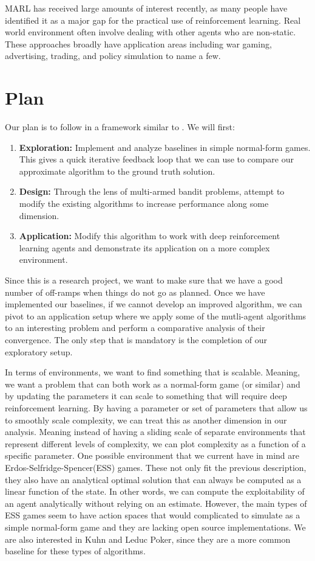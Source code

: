 \documentclass{article}
\begin{document}
MARL has received large amounts of interest recently, as many people have
identified it as a major gap for the practical use of reinforcement learning.
Real world environment often involve dealing with other agents who are
non-static. These approaches broadly have application areas including war gaming,
advertising, trading, and policy simulation to name a few.

\section{Plan}
Our plan is to follow in a framework similar to \cite{dip}. We will first:
\begin{enumerate}
	\item \textbf{Exploration:} Implement and analyze baselines in simple
        normal-form games. This gives a quick iterative feedback loop that we
        can use to compare our approximate algorithm to the ground truth
        solution.
	\item \textbf{Design:} Through the lens of multi-armed bandit problems,
        attempt to modify the existing algorithms to increase performance along
        some dimension.
    \item \textbf{Application:} Modify this algorithm to work with deep reinforcement learning agents
        and demonstrate its application on a more complex environment.
\end{enumerate}
Since this is a research project, we want to make sure that we have a good
number of off-ramps when things do not go as planned. Once we have implemented
our baselines, if we cannot develop an improved algorithm, we can pivot to an
application setup where we apply some of the mutli-agent algorithms to an
interesting problem and perform a comparative analysis of their convergence.
The only step that is mandatory is the completion of our exploratory setup. 

In terms of environments, we want to find something that is scalable. Meaning,
we want a problem that can both work as a normal-form game (or similar) and by
updating the parameters it can scale to something that will require deep
reinforcement learning. By having a parameter or set of parameters that allow us
to smoothly scale complexity, we can treat this as another dimension in our
analysis. Meaning instead of having a sliding scale of separate environments
that represent different levels of complexity, we can plot complexity as a
function of a specific parameter. One possible environment that we current have
in mind are Erdos-Selfridge-Spencer(ESS)\cite{ESS} games. These not only fit the
previous description, they also have an analytical optimal solution that can
always be computed as a linear function of the state. In other words, we can
compute the exploitability of an agent analytically without relying on an
estimate. However, the main types of ESS games seem to have action spaces that
would complicated to simulate as a simple normal-form game and they are lacking
open source implementations. We are also interested in Kuhn and Leduc Poker,
since they are a more common baseline for these types of algorithms.
\end{document}
